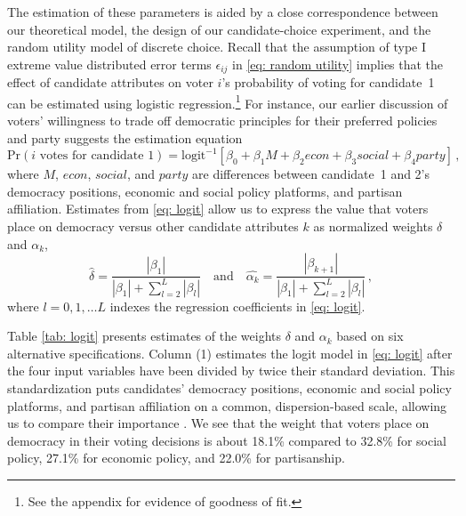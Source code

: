 \documentclass[letterpaper, 12pt]{article}
\begin{document}
\begin{raggedright}
The estimation of these parameters is aided by a close correspondence between our theoretical model, the design of our candidate-choice experiment, and the random utility model of discrete choice. Recall that the assumption of type I extreme value distributed error terms $\epsilon_{ij}$ in \eqref{eq: random utility} implies that the effect of candidate attributes on voter $i$'s probability of voting for candidate~1 can be estimated using logistic regression.\footnote{See the appendix for evidence of goodness of fit.} For instance, our earlier discussion of voters' willingness to trade off democratic principles for their preferred policies and party suggests the estimation equation
\begin{equation}
\label{eq: logit}
\text{Pr}(i \text{ votes for candidate~1}) = \text{logit}^{-1}\left[\beta_0 + \beta_1 M + \beta_2 econ + \beta_3 social + \beta_4 party \right] \, ,
\end{equation}
where $M$, $econ$, $social$, and $party$ are differences between candidate~1 and 2's democracy positions, economic and social policy platforms, and partisan affiliation. Estimates from \eqref{eq: logit} allow us to express the value that voters place on democracy versus other candidate attributes $k$ as normalized weights $\delta$ and $\alpha_k$,
\begin{equation*}
\hat{\delta} = \frac{|\beta_1|}{|\beta_1| + \sum\limits_{l=2}^L |\beta_l|} \quad \text{and} \quad \hat{\alpha_k} = \frac{|\beta_{k+1}|}{|\beta_1| + \sum\limits_{l=2}^L |\beta_l|} \, ,
\end{equation*}
where $l=0, 1, \dots L$ indexes the regression coefficients in \eqref{eq: logit}.


Table \ref{tab: logit} presents estimates of the weights $\delta$ and $\alpha_k$ based on six alternative specifications. Column (1) estimates the logit model in \eqref{eq: logit} after the four input variables have been divided by twice their standard deviation. This standardization puts candidates' democracy positions, economic and social policy platforms, and partisan affiliation on a common, dispersion-based scale, allowing us to compare their importance \citep{Gelman2008a}. We see that the weight that voters place on democracy in their voting decisions is about 18.1\% compared to 32.8\% for social policy, 27.1\% for economic policy, and 22.0\% for partisanship.


\end{raggedright}
\end{document}
